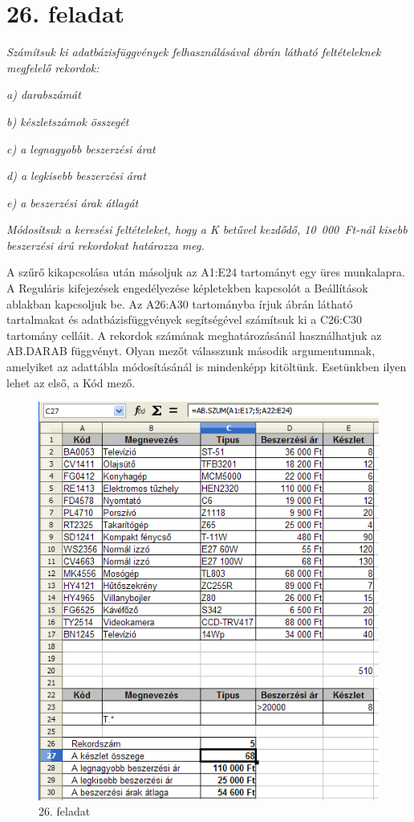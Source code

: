 \clearpage
\section{26. feladat}
{\itshape
Számítsuk ki adatbázisfüggvények felhasználásával  
ábrán látható feltételeknek megfelelő rekordok:}

{\itshape
a) darabszámát}

{\itshape
b) készletszámok összegét}

{\itshape
c) a legnagyobb beszerzési árat }

{\itshape
d) a legkisebb beszerzési árat}

{\itshape
e) a beszerzési árak átlagát}

{\itshape
Módosítsuk a keresési feltételeket, hogy a K betűvel
kezdődő, 10~000~Ft-nál kisebb beszerzési árú
 rekordokat határozza meg.}

A szűrő kikapcsolása után másoljuk az A1:E24 tartományt
egy üres munkalapra. A Reguláris kifejezések engedélyezése
képletekben kapcsolót a Beállítások ablakban kapcsoljuk be.
Az A26:A30 tartományba írjuk  ábrán látható
tartalmakat és adatbázisfüggvények segítségével
számítsuk ki a C26:C30 tartomány celláit. A rekordok
számának meghatározásánál használhatjuk az AB.DARAB
függvényt. Olyan mezőt válasszunk második argumentumnak,
amelyiket az adattábla módosításánál is mindenképp
kitöltünk. Esetünkben ilyen lehet az első, a Kód mező.

\begin{figure}[!h]
\begin{center}
\includegraphics[width=12.36cm]{oocalcv2-img120.png}
\caption{26. feladat}\label{26-feladat}
\end{center}
\end{figure}

